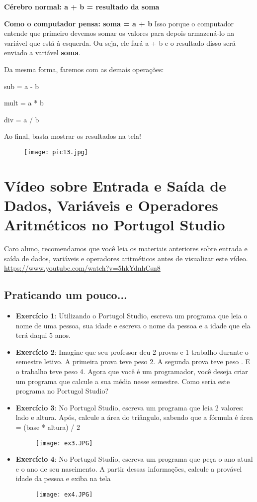 \documentclass{article}
\begin{document}
\textbf{Cérebro normal: a + b = resultado da soma}

\textbf{Como o computador pensa: soma = a + b}
Isso porque o computador entende que primeiro devemos somar os valores para depois armazená-lo na variável que está à esquerda. Ou seja, ele fará a + b e o resultado disso será enviado a variável \textbf{soma}.

Da mesma forma, faremos com as demais operações:

sub = a - b

mult = a * b

div = a / b

Ao final, basta mostrar os resultados na tela!
\begin{figure}[H]
    \centering
    \texttt{[image: pic13.jpg]}
    \label{fig:pic13}
\end{figure}

\section{Vídeo sobre Entrada e Saída de Dados, Variáveis e Operadores Aritméticos no Portugol Studio}
Caro aluno, recomendamos que você leia os materiais anteriores sobre entrada e saída de dados, variáveis e operadores aritméticos antes de visualizar este vídeo.
\href{https://www.youtube.com/watch?v=5hkYdnhCsn8}{https://www.youtube.com/watch?v=5hkYdnhCsn8}

\subsection{Praticando um pouco...}
\begin{itemize}
    \item \textbf{Exercício 1}: Utilizando o Portugol Studio, escreva um programa que leia o nome de uma pessoa, sua idade e escreva o nome da pessoa e a idade que ela terá daqui 5 anos.
    \item \textbf{Exercício 2}: Imagine que seu professor deu 2 provas e 1 trabalho durante o semestre letivo. A primeira prova teve peso 2. A segunda prova teve peso . E o trabalho teve peso 4.  Agora que você é um programador, você deseja criar um programa que calcule a sua média nesse semestre. Como seria este programa no Portugol Studio?
    \item \textbf{Exercício 3}: No Portugol Studio, escreva um programa que leia 2 valores: lado e altura. Após, calcule a área do triângulo, sabendo que a fórmula é área = (base * altura) / 2
    \begin{figure}[H]
    \centering
    \texttt{[image: ex3.JPG]}
    \label{fig:ex3.JPG}
    \end{figure}
    \item \textbf{Exercício 4}: No Portugol Studio, escreva um programa que peça o ano atual e o ano de seu nascimento. A partir dessas informações, calcule a provável idade da pessoa e exiba na tela
    \begin{figure}[H]
    \centering
    \texttt{[image: ex4.JPG]}
    \label{fig:e43.JPG}
    \end{figure}
\end{itemize}
\end{document}
